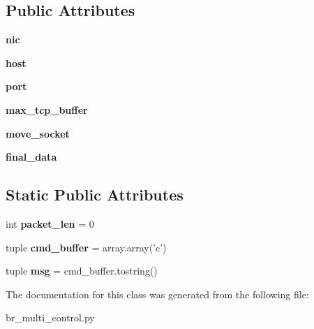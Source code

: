 \subsection*{Public Attributes}
\begin{DoxyCompactItemize}
\item 
\hypertarget{classbr__multi__control_1_1RovCon_a523a888f908ea48135ccc2e6da227cb3}{{\bfseries nic}}\label{classbr__multi__control_1_1RovCon_a523a888f908ea48135ccc2e6da227cb3}

\item 
\hypertarget{classbr__multi__control_1_1RovCon_a0a6c293474aee05be0dbd2f3d5a28ce3}{{\bfseries host}}\label{classbr__multi__control_1_1RovCon_a0a6c293474aee05be0dbd2f3d5a28ce3}

\item 
\hypertarget{classbr__multi__control_1_1RovCon_a18f31bc20c722907452d30b24b007f56}{{\bfseries port}}\label{classbr__multi__control_1_1RovCon_a18f31bc20c722907452d30b24b007f56}

\item 
\hypertarget{classbr__multi__control_1_1RovCon_a4c2f5a77ae435e83121b692e764e891e}{{\bfseries max\-\_\-tcp\-\_\-buffer}}\label{classbr__multi__control_1_1RovCon_a4c2f5a77ae435e83121b692e764e891e}

\item 
\hypertarget{classbr__multi__control_1_1RovCon_a0b46bc1af92e05afd71265281b9bcc5c}{{\bfseries move\-\_\-socket}}\label{classbr__multi__control_1_1RovCon_a0b46bc1af92e05afd71265281b9bcc5c}

\item 
\hypertarget{classbr__multi__control_1_1RovCon_a4109ce26cbd62ceb3196304bea39423d}{{\bfseries final\-\_\-data}}\label{classbr__multi__control_1_1RovCon_a4109ce26cbd62ceb3196304bea39423d}

\end{DoxyCompactItemize}
\subsection*{Static Public Attributes}
\begin{DoxyCompactItemize}
\item 
\hypertarget{classbr__multi__control_1_1RovCon_a9ec0b12584ebe6b497bea3e0a2d22781}{int {\bfseries packet\-\_\-len} = 0}\label{classbr__multi__control_1_1RovCon_a9ec0b12584ebe6b497bea3e0a2d22781}

\item 
\hypertarget{classbr__multi__control_1_1RovCon_a2a4d1b18588c6e6f1a45032a8dafb23f}{tuple {\bfseries cmd\-\_\-buffer} = array.\-array('c')}\label{classbr__multi__control_1_1RovCon_a2a4d1b18588c6e6f1a45032a8dafb23f}

\item 
\hypertarget{classbr__multi__control_1_1RovCon_a171ef46b81a3c0d18934c2c913533e53}{tuple {\bfseries msg} = cmd\-\_\-buffer.\-tostring()}\label{classbr__multi__control_1_1RovCon_a171ef46b81a3c0d18934c2c913533e53}

\end{DoxyCompactItemize}


The documentation for this class was generated from the following file\-:\begin{DoxyCompactItemize}
\item 
br\-\_\-multi\-\_\-control.\-py\end{DoxyCompactItemize}
